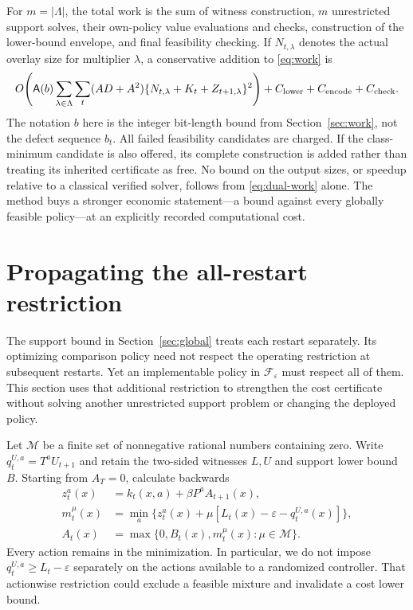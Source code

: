 For $m=|\Lambda|$, the total work is the sum of witness construction, $m$ unrestricted support solves, their own-policy value evaluations and checks, construction of the lower-bound envelope, and final feasibility checking. If $N_{t,\lambda}$ denotes the actual overlay size for multiplier $\lambda$, a conservative addition to \eqref{eq:work} is
\begin{equation}\label{eq:dual-work}
 O\!\left(\mathsf A(b)\sum_{\lambda\in\Lambda}\sum_t
 (AD+A^2)\{N_{t,\lambda}+K_t+Z_{t+1,\lambda}\}^2\right)
 +C_{\rm lower}+C_{\rm encode}+C_{\rm check}.
\end{equation}
The notation $b$ here is the integer bit-length bound from Section~\ref{sec:work}, not the defect sequence $b_t$. All failed feasibility candidates are charged. If the class-minimum candidate is also offered, its complete construction is added rather than treating its inherited certificate as free. No bound on the output sizes, or speedup relative to a classical verified solver, follows from \eqref{eq:dual-work} alone. The method buys a stronger economic statement---a bound against every globally feasible policy---at an explicitly recorded computational cost.

\section{Propagating the all-restart restriction}\label{sec:restart}
The support bound in Section~\ref{sec:global} treats each restart separately. Its optimizing comparison policy need not respect the operating restriction at subsequent restarts. Yet an implementable policy in $\mathcal F_\varepsilon$ must respect all of them. This section uses that additional restriction to strengthen the cost certificate without solving another unrestricted support problem or changing the deployed policy.

Let $\mathcal M$ be a finite set of nonnegative rational numbers containing zero. Write $q_t^{U,a}=T^aU_{t+1}$ and retain the two-sided witnesses $L,U$ and support lower bound $B$. Starting from $A_T=0$, calculate backwards
\begin{align}
 z_t^a(x)&=k_t(x,a)+\beta P^aA_{t+1}(x),\label{eq:restart-z}\\
 m_t^\mu(x)&=\min_a\{z_t^a(x)+\mu[L_t(x)-\varepsilon-q_t^{U,a}(x)]\},\label{eq:restart-m}\\
 A_t(x)&=\max\{0,B_t(x),m_t^\mu(x):\mu\in\mathcal M\}.\label{eq:restart-a}
\end{align}
Every action remains in the minimization. In particular, we do not impose $q_t^{U,a}\ge L_t-\varepsilon$ separately on the actions available to a randomized controller. That actionwise restriction could exclude a feasible mixture and invalidate a cost lower bound.

